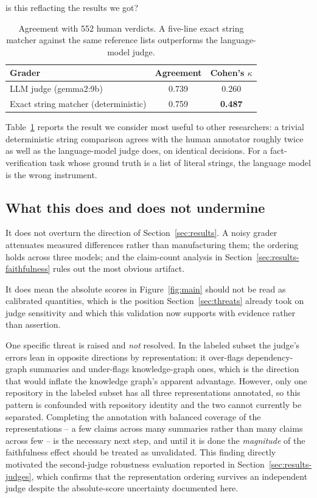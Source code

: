 is this reflacting the results we got?\documentclass[conference]{IEEEtran}
\begin{document}
\begin{table}[htbp]
\caption{Agreement with 552 human verdicts. A five-line exact string matcher against the same
reference lists outperforms the language-model judge.}
\label{tab:human}
\centering
\footnotesize
\begin{tabular}{@{}lcc@{}}
\toprule
Grader & Agreement & Cohen's $\kappa$ \\
\midrule
LLM judge (gemma2:9b) & 0.739 & 0.260 \\
Exact string matcher (deterministic) & 0.759 & \textbf{0.487} \\
\bottomrule
\end{tabular}
\end{table}

Table~\ref{tab:human} reports the result we consider most useful to other researchers: a trivial
deterministic string comparison agrees with the human annotator roughly twice as well as the
language-model judge does, on identical decisions. For a fact-verification task whose ground
truth is a list of literal strings, the language model is the wrong instrument.

\subsection{What this does and does not undermine}
\label{sec:human-implications}
It does not overturn the direction of Section~\ref{sec:results}. A noisy grader attenuates
measured differences rather than manufacturing them; the ordering holds across three models; and
the claim-count analysis in Section~\ref{sec:results-faithfulness} rules out the most obvious
artifact.

It does mean the absolute scores in Figure~\ref{fig:main} should not be read as calibrated
quantities, which is the position Section~\ref{sec:threats} already took on judge sensitivity and
which this validation now supports with evidence rather than assertion.

One specific threat is raised and \emph{not} resolved. In the labeled subset the judge's errors
lean in opposite directions by representation: it over-flags dependency-graph summaries and
under-flags knowledge-graph ones, which is the direction that would inflate the knowledge
graph's apparent advantage. However, only one repository in the labeled subset has all three
representations annotated, so this pattern is confounded with repository identity and the two
cannot currently be separated. Completing the annotation with balanced coverage of the
representations -- a few claims across many summaries rather than many claims across few -- is
the necessary next step, and until it is done the \emph{magnitude} of the faithfulness effect
should be treated as unvalidated. This finding directly motivated the second-judge robustness
evaluation reported in Section~\ref{sec:results-judges}, which confirms that the representation
ordering survives an independent judge despite the absolute-score uncertainty documented here.
\end{document}
